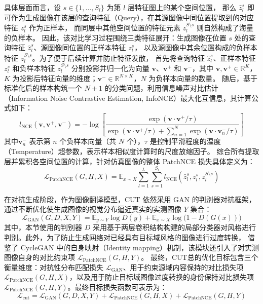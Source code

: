 具体层面而言，设 $s \in \{1, \dots, S_l\}$ 为第 $l$ 层特征图上的某个空间位置，
那么 $\hat{z}_l^s$ 即可作为生成图像在该层的查询特征（Query），在其源图像中同位置提取到的对应特征 $z_l^s$ 作为正样本，
而同层中其他空间位置的特征元素 $z_l^{S \setminus s}$ 则自然构成了海量的负样本。
因此，该对比学习过程围绕三类特征展开：生成图像在位置 $s$ 处的查询特征 $\hat{z}_l^s$、源图像同位置的正样本特征 $z_l^s$，
以及源图像中其余位置构成的负样本特征 $z_l^{S \setminus s}$。为了便于后续计算并防止特征发散，
首先将查询特征 $\hat{z}_l^s$、正样本特征 $z_l^s$ 和负样本特征 $z_l^{S \setminus s}$ 分别投影并归一化为向量 $\mathbf{v}$、$\mathbf{v}^+$ 和 $\mathbf{v}^-$，其中 $\mathbf{v}, \mathbf{v}^+ \in \mathbb{R}^K$，$K$ 为投影后特征向量的维度；$\mathbf{v}^- \in \mathbb{R}^{N \times K}$，$N$ 为负样本向量的数量。
随后，基于标准化后的样本构筑一个 $N+1$ 的分类问题，利用信息噪声对比估计（Information Noise Contrastive Estimation, InfoNCE）最大化互信息，其计算公式如下：
\begin{equation}
l_{\text{NCE}}(\mathbf{v}, \mathbf{v}^+, \mathbf{v}^-) = - \log \left[ \frac{\exp(\mathbf{v} \cdot \mathbf{v}^+ / \tau)}{\exp(\mathbf{v} \cdot \mathbf{v}^+ / \tau) + \sum_{n=1}^{N} \exp(\mathbf{v} \cdot \mathbf{v}_n^- / \tau)} \right]
\end{equation}
其中$\mathbf{v}_n^-$ 表示第 $n$ 个负样本向量（共 $N$ 个），$\tau$ 是控制平滑程度的温度（Temperature）超参数，表示样本相似度计算时的尺度放缩因子。
综合所有提取层并累积各空间位置的计算，针对仿真图像的整体 PatchNCE 损失具体定义为：
\begin{equation}
\mathcal{L}_{\text{PatchNCE}}(G,H,X) = \mathbb{E}_{x \sim X} \sum_{l=1}^{L} \sum_{s=1}^{S_l} l_{\text{NCE}} \left( \hat{z}_l^s, z_l^s, z_l^{S \setminus s} \right)
\end{equation}

在对抗生成阶段，作为图像翻译模型，CUT 依然采用 GAN 的判别器对抗框架，通过不断优化使生成图像的视觉分布逼近真实的实测图像 $Y$ 集合：
\begin{equation}
\mathcal{L}_{\text{GAN}}(G,D,X,Y) = \mathbb{E}_{y \sim Y} \log D(y) + \mathbb{E}_{x \sim X} \log\bigl(1 - D(G(x))\bigr)
\end{equation}
其中，本节使用的判别器 $D$ 采用基于两层卷积结构构建的局部分类器对风格进行判别。此外，为了防止生成网络对已经具有目标域风格的图像进行过度转换，
借鉴了 CycleGAN 中的自身映射（Identity mapping）机制，该模块还引入了对实测图像自身的对比约束项 $\mathcal{L}_{\text{PatchNCE}}(G,H,Y)$。
最终，CUT总的优化目标包含三个衡量维度：对抗性分布匹配损失 $\mathcal{L}_{\text{GAN}}$、用于约束源域内容保持的对比损失项 $\mathcal{L}_{\text{PatchNCE}}(G,H,X)$，以及用于防止目标域图像过度转换的身份保持对比损失项 $\mathcal{L}_{\text{PatchNCE}}(G,H,Y)$。最终目标损失函数可表示为：
\begin{equation}
\mathcal{L}_{\text{cut}} = \mathcal{L}_{\text{GAN}}(G,D,X,Y) + \mathcal{L}_{\text{PatchNCE}}(G,H,X) + \mathcal{L}_{\text{PatchNCE}}(G,H,Y)
\end{equation}

